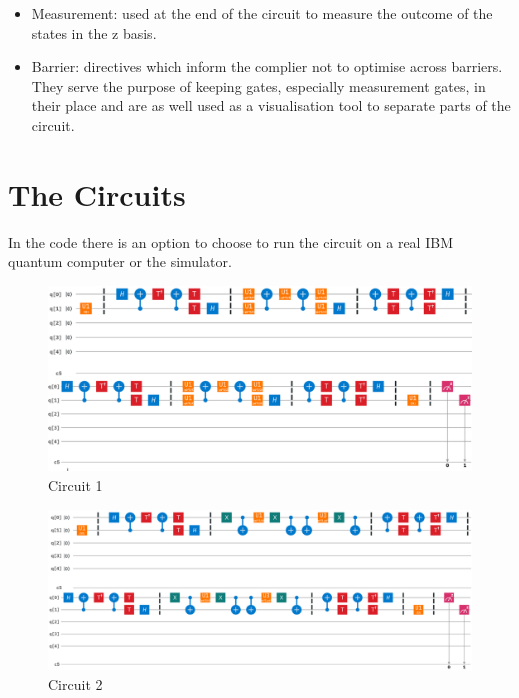 \documentclass{article}
\begin{document}
\begin{itemize}[labelindent=1.5em,labelsep=0.9cm,leftmargin=*]
    \item{} {} {} {} {} Measurement: used at the end of the circuit to measure the outcome of the states in the z basis.
    \item{} {} {} {} {} Barrier: directives which inform the complier not to optimise across barriers. They serve the purpose of keeping gates, especially measurement gates, in their place and are as well used as a visualisation tool to separate parts of the circuit.
\end{itemize}


\section{The Circuits}

In the code there is an option to choose to run the circuit on a real IBM quantum computer or the simulator.

\begin{figure}[!htb]
\includegraphics[scale=0.42]{../images/circuit1_colour}
  \centering
  \caption{Circuit 1}
\end{figure}

\begin{figure}[!htb]
\includegraphics[scale=0.34]{../images/circuit2_colour}
  \centering
  \caption{Circuit 2}
\end{figure}
\end{document}
